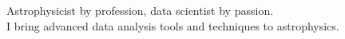 \documentclass[letterpaper,12pt]{deedy-resume} %
\begin{document}
{\large 
Astrophysicist by profession, data scientist by passion.\\
I bring advanced data analysis tools and techniques to astrophysics.









}

\end{document}
